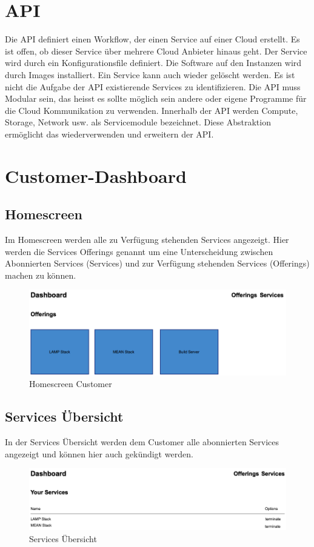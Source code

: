 \section{API}
Die API definiert einen Workflow, der einen \gls{Service} auf einer Cloud erstellt. Es ist offen, ob 
dieser Service über mehrere Cloud Anbieter hinaus geht. Der Service wird durch 
ein Konfigurationsfile definiert. Die Software auf den Instanzen wird durch Images installiert.
 Ein Service kann auch wieder gelöscht werden.
 Es ist nicht die Aufgabe der API existierende Services zu identifizieren. 
 Die API muss Modular sein, das heisst es sollte möglich sein andere oder eigene 
 Programme für die Cloud Kommunikation zu verwenden. Innerhalb der API 
 werden Compute, Storage, Network usw. als Servicemodule bezeichnet. 
 Diese Abstraktion ermöglicht das wiederverwenden und erweitern der API.
\newpage
\section{Customer-Dashboard}
\subsection{Homescreen}
Im Homescreen werden alle zu 
Verfügung stehenden Services angezeigt.
Hier werden die Services Offerings genannt um eine Unterscheidung zwischen 
Abonnierten Services (Services) und zur Verfügung stehenden Services (Offerings) 
machen zu können.

\begin{figure}[!htbp]
\includegraphics[width=\textwidth]{./04_Anforderungen/images/homescreen_customer}
\caption{Homescreen Customer}
\end{figure}

\subsection{Services Übersicht}
In der Services Übersicht werden dem Customer alle abonnierten Services 
angezeigt und können hier auch gekündigt werden.
\newline
\begin{figure}[!htbp]
\includegraphics[width=\textwidth]{./04_Anforderungen/images/services_overview}
\caption{Services Übersicht}
\end{figure}


